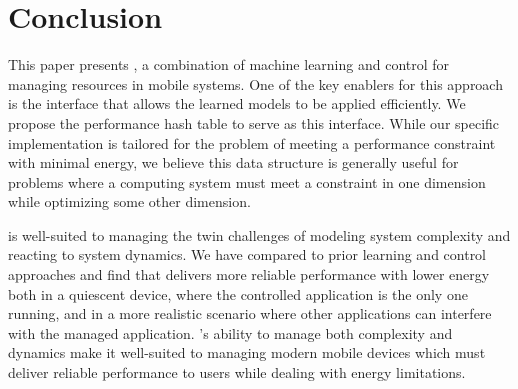 \section{Conclusion}
This paper presents \SYSTEM{}, a combination of machine learning and
control for managing resources in mobile systems.  One of the key
enablers for this approach is the interface that allows the learned
models to be applied efficiently.  We propose the performance hash
table to serve as this interface.  While our specific implementation
is tailored for the problem of meeting a performance constraint with
minimal energy, we believe this data structure is generally useful for
problems where a computing system must meet a constraint in one
dimension while optimizing some other dimension.

\SYSTEM{} is well-suited to managing the twin challenges of modeling
system complexity and reacting to system dynamics.  We have compared
\SYSTEM{} to prior learning and control approaches and find that
\SYSTEM{} delivers more reliable performance with lower energy both in
a quiescent device, where the controlled application is the only one
running, and in a more realistic scenario where other applications can
interfere with the managed application.  \SYSTEM{}'s ability to manage
both complexity and dynamics make it well-suited to managing modern
mobile devices which must deliver reliable performance to users while
dealing with energy limitations.
